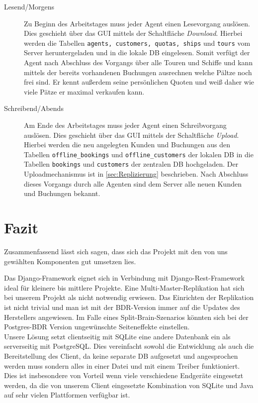\documentclass[12pt,a4paper,ngerman,english]{report}
\begin{document}
\begin{description}
\item[Lesend/Morgens] Zu Beginn des Arbeitstages muss jeder Agent einen Lesevorgang auslösen. Dies geschieht über das GUI mittels der Schaltfläche \emph{Download}. Hierbei werden die Tabellen \texttt{agents, customers, quotas, ships} und \texttt{tours} vom Server heruntergeladen und in die lokale DB eingelesen. Somit verfügt der Agent nach Abschluss des Vorgangs über alle Touren und Schiffe und kann mittels der bereits vorhandenen Buchungen ausrechnen welche Pältze noch frei sind. Er kennt außerdem seine persönlichen Quoten und weiß daher wie viele Pätze er maximal verkaufen kann.
\item[Schreibend/Abends] Am Ende des Arbeitstages muss jeder Agent einen Schreibvorgang auslösen. Dies geschieht über das GUI mittels der Schaltfläche \emph{Upload}. Hierbei werden die neu angelegten Kunden und Buchungen aus den Tabellen \texttt{offline\_bookings} und \texttt{offline\_customers} der lokalen DB in die Tabellen \texttt{bookings} und \texttt{customers} der zentralen DB hochgeladen. Der Uploadmechanismus ist in \autoref{sec:Replizierung} beschrieben. Nach Abschluss dieses Vorgangs durch alle Agenten sind dem Server alle neuen Kunden und Buchungen bekannt. 
\end{description}

\chapter{Fazit}
Zusammenfassend lässt sich sagen, dass sich das Projekt mit den von uns gewählten Komponenten gut umsetzen lies. 

Das Django-Framework eignet sich in Verbindung mit Django-Rest-Framework ideal für kleinere bis mittlere Projekte. 
Eine Multi-Master-Replikation hat sich bei unserem Projekt als nicht notwendig erwiesen. Das Einrichten der Replikation ist nicht trivial und man ist mit der BDR-Version immer auf die Updates des Herstellers angewiesen. Im Falle eines Split-Brain-Szenarios könnten sich bei der Postgres-BDR Version ungewünschte Seiteneffekte einstellen.\\



Unsere Lösung setzt clientseitig mit SQLite eine andere Datenbank ein als serverseitig mit PostgreSQL. Dies vereinfacht sowohl die Entwicklung als auch die Bereitstellung des Client, da keine separate DB aufgesetzt und angesprochen werden muss sondern alles in einer Datei und mit einem Treiber funktioniert. Dies ist insbesondere von Vorteil wenn viele verschiedene Endgeräte eingesetzt werden, da die von unserem Client eingesetzte Kombination von SQLite und Java auf sehr vielen Plattformen verfügbar ist.\\
\end{document}
